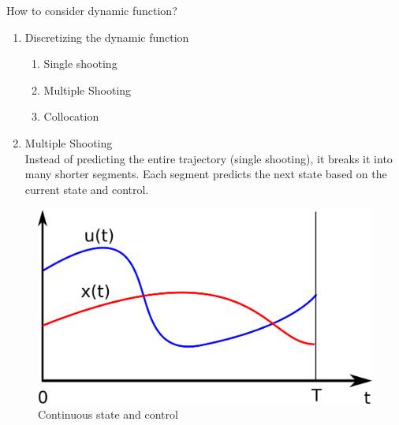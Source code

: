 \documentclass[10pt,compress]{beamer}
\begin{document}
\begin{frame}{How to consider dynamic function? }
    \begin{minipage}[c]{0.5\linewidth}
        \begin{enumerate}
            \item Discretizing the dynamic function
            \begin{enumerate}
                \item Single shooting
                \item Multiple Shooting
                \item Collocation
            \end{enumerate}
            \item Multiple Shooting \\
            Instead of predicting the entire trajectory (single shooting), it breaks it into many shorter segments. Each segment predicts the next state based on the current state and control. 
        \end{enumerate}
    \end{minipage}
    \begin{minipage}[c]{0.45\linewidth}
    \vspace{0.2 cm}
    \begin{figure}[h]
        \includegraphics{images/xu_cont.png}
        \caption{Continuous state and control}
    \end{figure}
    

\end{minipage}
\end{frame}
\end{document}
